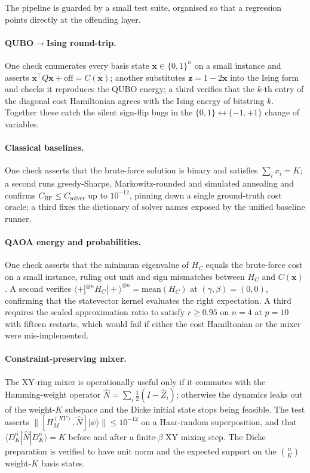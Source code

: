 The pipeline is guarded by a small test suite, organised so that a regression points directly at the offending layer.

\paragraph{QUBO$\to$Ising round-trip.} One check enumerates every basis state $\boldsymbol{x}\in\{0,1\}^n$ on a small instance and asserts $\boldsymbol{x}^\top Q\boldsymbol{x} + \mathrm{off} = C(\boldsymbol{x})$; another substitutes $\boldsymbol{z} = 1-2\boldsymbol{x}$ into the Ising form and checks it reproduces the QUBO energy; a third verifies that the $k$-th entry of the diagonal cost Hamiltonian agrees with the Ising energy of bitstring $k$. Together these catch the silent sign-flip bugs in the $\{0,1\}\!\leftrightarrow\!\{-1,+1\}$ change of variables.

\paragraph{Classical baselines.} One check asserts that the brute-force solution is binary and satisfies $\sum_i x_i = K$; a second runs greedy-Sharpe, Markowitz-rounded and simulated annealing and confirms $C_{\text{BF}} \leq C_{\text{solver}}$ up to $10^{-12}$, pinning down a single ground-truth cost oracle; a third fixes the dictionary of solver names exposed by the unified baseline runner.

\paragraph{QAOA energy and probabilities.} One check asserts that the minimum eigenvalue of $H_C$ equals the brute-force cost on a small instance, ruling out unit and sign mismatches between $H_C$ and $C(\boldsymbol{x})$. A second verifies $\langle +|^{\otimes n} H_C |+\rangle^{\otimes n} = \mathrm{mean}(H_C)$ at $(\gamma,\beta)=(0,0)$, confirming that the statevector kernel evaluates the right expectation. A third requires the scaled approximation ratio to satisfy $r\geq 0.95$ on $n=4$ at $p=10$ with fifteen restarts, which would fail if either the cost Hamiltonian or the mixer were mis-implemented.

\paragraph{Constraint-preserving mixer.} The XY-ring mixer is operationally useful only if it commutes with the Hamming-weight operator $\hat N = \sum_i \tfrac{1}{2}(I-\hat Z_i)$; otherwise the dynamics leaks out of the weight-$K$ subspace and the Dicke initial state stops being feasible. The test asserts $\|[H_M^{(XY)}, \hat N]|\psi\rangle\| \leq 10^{-12}$ on a Haar-random superposition, and that $\langle D^n_K|\hat N|D^n_K\rangle = K$ before and after a finite-$\beta$ XY mixing step. The Dicke preparation is verified to have unit norm and the expected support on the $\binom{n}{K}$ weight-$K$ basis states.

